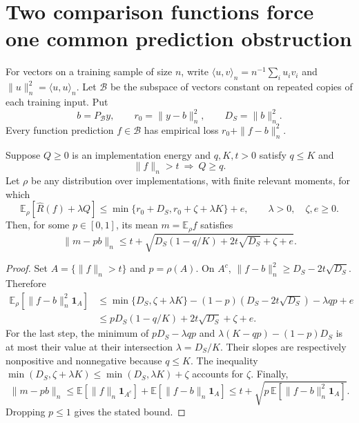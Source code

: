 \section{Two comparison functions force one common prediction obstruction}
For vectors on a training sample of size $n$, write
$\langle u,v\rangle_n=n^{-1}\sum_i u_iv_i$ and $\|u\|_n^2=\langle u,u\rangle_n$.
Let $\mathcal B$ be the subspace of vectors constant on repeated copies of each training input. Put
\[
 b=P_{\mathcal B}y,\qquad r_0=\|y-b\|_n^2,\qquad D_S=\|b\|_n^2.
\]
Every function prediction $f\in\mathcal B$ has empirical loss $r_0+\|f-b\|_n^2$.

\begin{lemma}
\label{lem:segment}
Suppose $Q\ge0$ is an implementation energy and $q,K,t>0$ satisfy $q\le K$ and
\[
 \|f\|_n>t\ \Longrightarrow\ Q\ge q.
\]
Let $\rho$ be any distribution over implementations, with finite relevant moments, for which
\begin{equation}
 \mathbb E_\rho[\widehat R(f)+\lambda Q]
 \le\min\{r_0+D_S,r_0+\zeta+\lambda K\}+e,
 \qquad \lambda>0,\quad \zeta,e\ge0.
 \label{eq:objective-comparisons}
\end{equation}
Then, for some $p\in[0,1]$, its mean $m=\mathbb E_\rho f$ satisfies
\begin{equation}
 \|m-pb\|_n\le t+
 \sqrt{D_S(1-q/K)+2t\sqrt{D_S}+\zeta+e}.
 \label{eq:segment}
\end{equation}
\end{lemma}
\begin{proof}
Set $A=\{\|f\|_n>t\}$ and $p=\rho(A)$. On $A^c$,
$\|f-b\|_n^2\ge D_S-2t\sqrt{D_S}$. Therefore
\begin{align*}
 \mathbb E_\rho[\|f-b\|_n^2\mathbf1_A]
 &\le\min\{D_S,\zeta+\lambda K\}
       -(1-p)(D_S-2t\sqrt{D_S})-\lambda qp+e\\
 &\le pD_S(1-q/K)+2t\sqrt{D_S}+\zeta+e.
\end{align*}
For the last step, the minimum of
$pD_S-\lambda qp$ and $\lambda(K-qp)-(1-p)D_S$
is at most their value at their intersection $\lambda=D_S/K$.
Their slopes are respectively nonpositive and nonnegative because $q\le K$.
The inequality $\min(D_S,\zeta+\lambda K)\le\min(D_S,\lambda K)+\zeta$ accounts for $\zeta$.
Finally,
\[
 \|m-pb\|_n
 \le\mathbb E[\|f\|_n\mathbf1_{A^c}]
       +\mathbb E[\|f-b\|_n\mathbf1_A]
 \le t+\sqrt{p\,\mathbb E[\|f-b\|_n^2\mathbf1_A]}.
\]
Dropping $p\le1$ gives the stated bound.
\end{proof}

